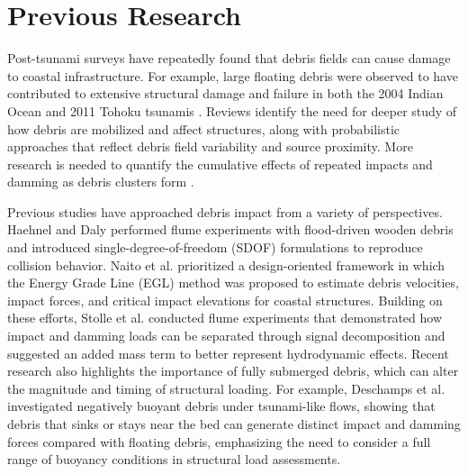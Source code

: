 \documentclass[10pt,a4paper]{article}
\begin{document}
\section{Previous Research} Post-tsunami surveys have repeatedly found that debris fields can cause damage to coastal infrastructure. For example, large floating debris were observed to have contributed to extensive structural damage and failure in both the 2004 Indian Ocean and 2011 Tohoku tsunamis \citep{Leonard2011,Akiyama2013}. Reviews identify the need for deeper study of how debris are mobilized and affect structures, along with probabilistic approaches that reflect debris field variability and source proximity. More research is needed to quantify the  cumulative effects of repeated impacts and damming as debris clusters form \citep{nistorTsunamiDrivenDebrisMotion2017}.

Previous studies have approached debris impact from a variety of perspectives. Haehnel and Daly \citep{Haehnel2004} performed flume experiments with flood-driven wooden debris and introduced single-degree-of-freedom (SDOF) formulations to reproduce collision behavior. Naito et al. \citep{Naito2016} prioritized a design-oriented framework in which the Energy Grade Line (EGL) method was proposed to estimate debris velocities, impact forces, and critical impact elevations for coastal structures. Building on these efforts, Stolle et al. \citep{Stolle2018,Stolle2019} conducted flume experiments that demonstrated how impact and damming loads can be separated through signal decomposition and suggested an added mass term to better represent hydrodynamic effects. Recent research also highlights the importance of  fully submerged debris, which can alter the magnitude and timing of structural loading. For example, Deschamps et al. \citep{deschampsNegativelyBuoyantDebris2025} investigated negatively buoyant debris under tsunami-like flows, showing that debris that sinks or stays near the bed can generate distinct impact and damming forces compared with floating debris, emphasizing the need to consider a full range of buoyancy conditions in structural load assessments.
\end{document}
